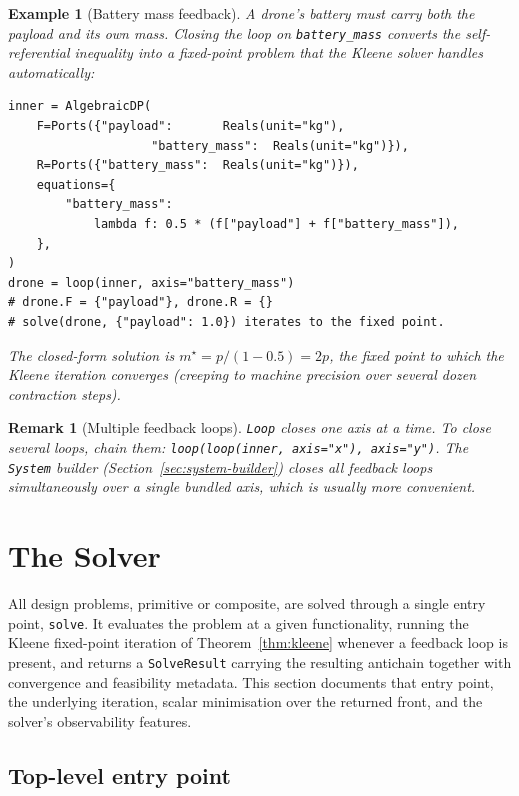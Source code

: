 \documentclass[11pt,a4paper]{article}
\newtheorem{example}[definition]{Example}
\newtheorem{remark}[definition]{Remark}
\begin{document}
\begin{example}[Battery mass feedback]
A drone's battery must carry both the payload \emph{and} its own
mass. Closing the loop on \texttt{battery\_mass} converts the
self-referential inequality into a fixed-point problem that the
Kleene solver handles automatically:
\begin{lstlisting}
inner = AlgebraicDP(
    F=Ports({"payload":       Reals(unit="kg"),
                    "battery_mass":  Reals(unit="kg")}),
    R=Ports({"battery_mass":  Reals(unit="kg")}),
    equations={
        "battery_mass":
            lambda f: 0.5 * (f["payload"] + f["battery_mass"]),
    },
)
drone = loop(inner, axis="battery_mass")
# drone.F = {"payload"}, drone.R = {}
# solve(drone, {"payload": 1.0}) iterates to the fixed point.
\end{lstlisting}
The closed-form solution is $m^\star = p / (1 - 0.5) = 2p$, the fixed
point to which the Kleene iteration converges (creeping to machine
precision over several dozen contraction steps).
\end{example}

\begin{remark}[Multiple feedback loops]
\texttt{Loop} closes one axis at a time. To close several loops,
chain them: \texttt{loop(loop(inner, axis="x"), axis="y")}. The
\texttt{System} builder (Section~\ref{sec:system-builder}) closes all
feedback loops simultaneously over a single bundled axis, which is
usually more convenient.
\end{remark}

\section{The Solver}
\label{sec:solver}

All design problems, primitive or composite, are solved through a single
entry point, \texttt{solve}. It evaluates the problem at a given
functionality, running the Kleene fixed-point iteration of
Theorem~\ref{thm:kleene} whenever a feedback loop is present, and returns
a \texttt{SolveResult} carrying the resulting antichain together with
convergence and feasibility metadata. This section documents that entry
point, the underlying iteration, scalar minimisation over the returned
front, and the solver's observability features.

\subsection{Top-level entry point}
\end{document}
